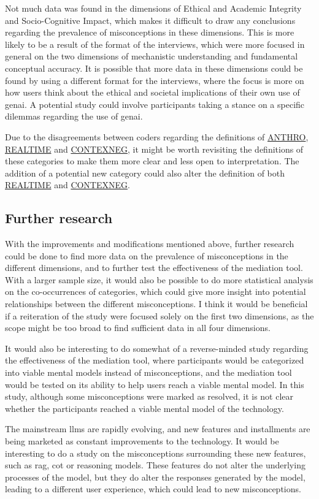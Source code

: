 Not much data was found in the dimensions of Ethical and Academic Integrity and Socio-Cognitive Impact, which makes it difficult to draw any conclusions regarding the prevalence of misconceptions in these dimensions. This is more likely to be a result of the format of the interviews, which were more focused in general on the two dimensions of mechanistic understanding and fundamental conceptual accuracy. It is possible that more data in these dimensions could be found by using a different format for the interviews, where the focus is more on how users think about the ethical and societal implications of their own use of \gls{genai}. A potential study could involve participants taking a stance on a specific dilemmas regarding the use of \gls{genai}.

Due to the disagreements between coders regarding the definitions of \hyperref[anthro]{ANTHRO}, \hyperref[realtime]{REALTIME} and \hyperref[contexneg]{CONTEXNEG}, it might be worth revisiting the definitions of these categories to make them more clear and less open to interpretation. The addition of a potential new category could also alter the definition of both \hyperref[realtime]{REALTIME} and \hyperref[contexneg]{CONTEXNEG}.

\subsection*{Further research}
With the improvements and modifications mentioned above, further research could be done to find more data on the prevalence of misconceptions in the different dimensions, and to further test the effectiveness of the mediation tool. With a larger sample size, it would also be possible to do more statistical analysis on the co-occurrences of categories, which could give more insight into potential relationships between the different misconceptions. I think it would be beneficial if a reiteration of the study were focused solely on the first two dimensions, as the scope might be too broad to find sufficient data in all four dimensions.

It would also be interesting to do somewhat of a reverse-minded study regarding the effectiveness of the mediation tool, where participants would be categorized into viable mental models instead of misconceptions, and the mediation tool would be tested on its ability to help users reach a viable mental model. In this study, although some misconceptions were marked as resolved, it is not clear whether the participants reached a viable mental model of the technology. 

The mainstream \gls{llms} are rapidly evolving, and new features and installments are being marketed as constant improvements to the technology. It would be interesting to do a study on the misconceptions surrounding these new features, such as \gls{rag}, \gls{cot} or reasoning models. These features do not alter the underlying processes of the model, but they do alter the responses generated by the model, leading to a different user experience, which could lead to new misconceptions. 
